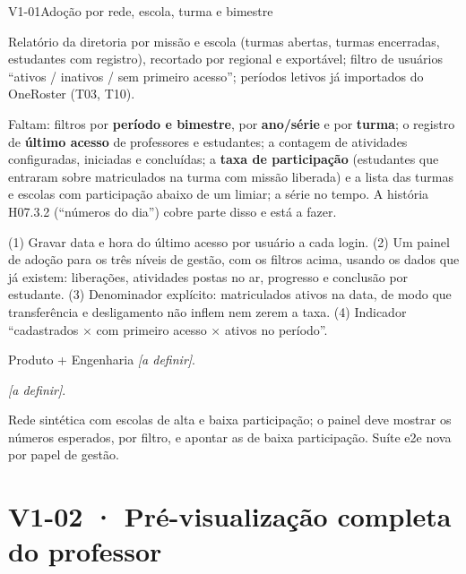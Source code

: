 \begin{resposta}{V1-01}{Adoção por rede, escola, turma e bimestre}{\parcial}
\begin{campos}
  \item[Existe] Relatório da diretoria por missão e escola (turmas abertas,
    turmas encerradas, estudantes com registro), recortado por regional e
    exportável; filtro de usuários ``ativos / inativos / sem primeiro
    acesso''; períodos letivos já importados do OneRoster (T03, T10).
  \item[Diferença] Faltam: filtros por \textbf{período e bimestre}, por
    \textbf{ano/série} e por \textbf{turma}; o registro de \textbf{último
    acesso} de professores e estudantes; a contagem de atividades
    configuradas, iniciadas e concluídas; a \textbf{taxa de participação}
    (estudantes que entraram sobre matriculados na turma com missão liberada)
    e a lista das turmas e escolas com participação abaixo de um limiar; a
    série no tempo. A história H07.3.2 (``números do dia'') cobre parte disso
    e está a fazer.
  \item[Proposta] (1) Gravar data e hora do último acesso por usuário a cada
    login. (2) Um painel de adoção para os três níveis de gestão, com os
    filtros acima, usando os dados que já existem: liberações, atividades
    postas no ar, progresso e conclusão por estudante. (3) Denominador
    explícito: matriculados ativos na data, de modo que transferência e
    desligamento não inflem nem zerem a taxa. (4) Indicador ``cadastrados
    $\times$ com primeiro acesso $\times$ ativos no período''.
  \item[Responsável] Produto + Engenharia \textit{[a definir]}.
  \item[Homologação] \textit{[a definir]}.
  \item[Aceite] Rede sintética com escolas de alta e baixa participação; o
    painel deve mostrar os números esperados, por filtro, e apontar as de
    baixa participação. Suíte e2e nova por papel de gestão.
\end{campos}
\end{resposta}

\section{V1-02 · Pré-visualização completa do professor}

